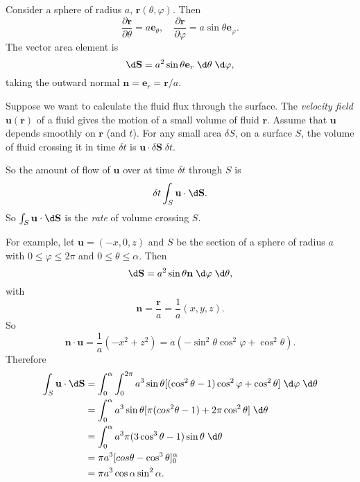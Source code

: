 \documentclass[a4paper]{article}
\begin{document}
\begin{eg}
  Consider a sphere of radius $a$, $\mathbf{r}(\theta, \varphi)$. Then
  \[
    \frac{\partial \mathbf{r}}{\partial \theta} = a\mathbf{e}_\theta,\quad \frac{\partial \mathbf{r}}{\partial \varphi} = a\sin \theta \mathbf{e}_\varphi.
  \]
  The vector area element is
  \[
    \d \mathbf{S} = a^2\sin \theta \mathbf{e}_r \;\d \theta\; \d\varphi,
  \]
  taking the outward normal $\mathbf{n} = \mathbf{e}_r = \mathbf{r}/a$.

  Suppose we want to calculate the fluid flux through the surface. The \emph{velocity field} $\mathbf{u}(\mathbf{r})$ of a fluid gives the motion of a small volume of fluid $\mathbf{r}$. Assume that $\mathbf{u}$ depends smoothly on $\mathbf{r}$ (and $t$). For any small area $\delta S$, on a surface $S$, the volume of fluid crossing it in time $\delta t$ is $\mathbf{u}\cdot \delta \mathbf{S}\; \delta t$.
  \begin{center}
  \end{center}
  So the amount of flow of $\mathbf{u}$ over at time $\delta t$ through $S$ is
  \[
    \delta t\int_S \mathbf{u}\cdot \d \mathbf{S}.
  \]
  So $\int_S \mathbf{u}\cdot \d \mathbf{S}$ is the \emph{rate} of volume crossing $S$.

  For example, let $\mathbf{u} = (-x, 0, z)$ and $S$ be the section of a sphere of radius $a$ with $0 \leq \varphi \leq 2\pi$ and $0 \leq \theta \leq \alpha$. Then
  \[
    \d \mathbf{S} = a^2 \sin \theta \mathbf{n}\;\d \varphi \;\d \theta,
  \]
  with
  \[
    \mathbf{n} = \frac{\mathbf{r}}{a} = \frac{1}{a}(x, y, z).
  \]
  So
  \[
    \mathbf{n}\cdot \mathbf{u} = \frac{1}{a}(-x^2 + z^2) = a(-\sin^2\theta\cos^2\varphi + \cos^2 \theta).
  \]
  Therefore
  \begin{align*}
    \int_S \mathbf{u}\cdot \d \mathbf{S} &= \int_0^\alpha \int_0^{2\pi} a^3 \sin \theta[(\cos^2\theta - 1) \cos^2 \varphi + \cos^2 \theta]\;\d \varphi\;\d \theta\\
    &= \int_0^\alpha a^3\sin \theta[\pi(cos^2\theta - 1) + 2\pi \cos^2\theta]\; \d \theta\\
    &=\int_0^\alpha a^3\pi(3\cos^3 \theta - 1)\sin \theta\;\d \theta\\
    &= \pi a^3[cos\theta - \cos^3 \theta]_0^\alpha\\
    &= \pi a^3 \cos \alpha\sin^2 \alpha.
  \end{align*}
\end{eg}
\end{document}
